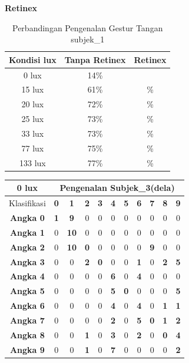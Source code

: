 \textbf{Retinex}
\begin{table}[H]
	\caption{Perbandingan Pengenalan Gestur Tangan subjek\_1}
	\vspace{0cm}
	\centering
	\begin{tabular}{|c|c|c|}
		\hline Kondisi lux &  Tanpa Retinex &Retinex \\
		\hline 0 lux & 14\%&\\
		\hline 15 lux &61\% & \% \\
		\hline 20 lux &72\% &\% \\
		\hline 25 lux &73\% &\% \\
		\hline 33 lux &73\% &\% \\		
		\hline 77 lux &75\% &\% \\
		\hline  133 lux& 77\% & \% \\
		\hline
	\end{tabular}
\end{table}

\begin{tabular}{|c|c|c|c|c|c|c|c|c|c|c|}
	\hline 0 lux
	& \multicolumn{10}{|c|}{Pengenalan Subjek\_3(dela)} \\
	\hline  Klasifikasi&\textbf{0} &\textbf{1} &\textbf{2} &\textbf{3} &\textbf{4}&\textbf{5} &\textbf{6}&\textbf{7}&\textbf{8}&\textbf{9}\\
	\hline \textbf{Angka 0} &\textbf{1} &\textbf{9} &0 &0&0&0&0&0&0&0\\
	\hline \textbf{Angka 1} &0 &\textbf{10} &0 &0&0&0&0&0&0&0\\
	\hline \textbf{Angka 2} &0 &\textbf{10} &\textbf{0} &0 &0&0 &0&\textbf{9}&0&0\\
	\hline \textbf{Angka 3} &0 &0 &\textbf{2} &\textbf{0} &0&0 &\textbf{1}&0&\textbf{2}&\textbf{5}\\
	\hline \textbf{Angka 4} &0 &0 &0 &0 &\textbf{6}&0&\textbf{4}&0&0&0\\
	\hline \textbf{Angka 5} &0 &0 &0 &0 &\textbf{5} &\textbf{0}&0&0&0&\textbf{5}\\
	\hline \textbf{Angka 6} &0 &0 &0 &0 &\textbf{4} &0&\textbf{4}&0&\textbf{1}&\textbf{1}\\
	\hline \textbf{Angka 7} &0 &0 &0 &0 &\textbf{2} &0&\textbf{5}&\textbf{0}&\textbf{1}&\textbf{2}\\
	\hline \textbf{Angka 8} &0 &0 &\textbf{1} &0&\textbf{3}&0&\textbf{2}&0&\textbf{0}&\textbf{4} \\
	\hline \textbf{Angka 9} &0 &0 &\textbf{1} &0&\textbf{7}&0&0&0&0&\textbf{2} \\
	\hline
\end{tabular}

